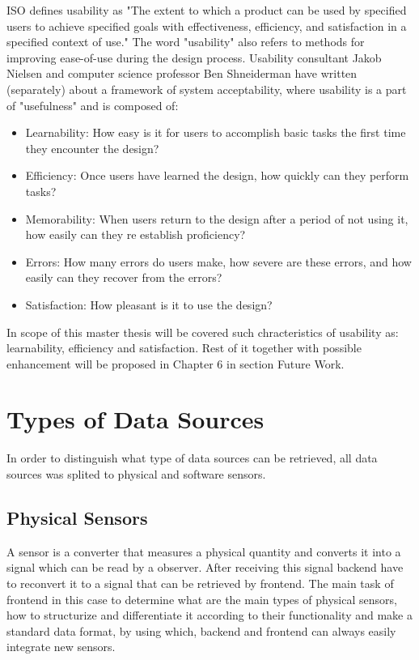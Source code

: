 	ISO defines usability as "The extent to which a product can be used by specified users to achieve specified goals with effectiveness, efficiency, and satisfaction in a specified context of use." The word "usability" also refers to methods for improving ease-of-use during the design process. Usability consultant Jakob Nielsen and computer science professor Ben Shneiderman have written (separately) about a framework of system acceptability, where usability is a part of "usefulness" and is composed of\cite{jakob}:
	\begin{itemize}
	\item Learnability: How easy is it for users to accomplish basic tasks the first time they encounter the design?
	\item Efficiency: Once users have learned the design, how quickly can they perform tasks?
	\item Memorability: When users return to the design after a period of not using it, how easily can they re establish proficiency?
	\item Errors: How many errors do users make, how severe are these errors, and how easily can they recover from the errors?
	\item Satisfaction: How pleasant is it to use the design?
	\end{itemize}

	In scope of this master thesis will be covered such chracteristics of usability as: learnability, efficiency and satisfaction. Rest of it together with possible enhancement will be proposed in Chapter 6 in section Future Work.

\section {Types of Data Sources}
    In order to distinguish what type of data sources can be retrieved, all data sources was splited to physical and software sensors. 

	\subsection {Physical Sensors}
	A sensor is a converter that measures a physical quantity and converts it into a signal which can be read by a observer. After receiving this signal backend have to reconvert it to a signal that can be retrieved by frontend. The main task of frontend in this case to determine what are the main types of physical sensors, how to structurize and differentiate it according to their functionality and make a standard data format, by using which, backend and frontend can always easily integrate new sensors.
    

